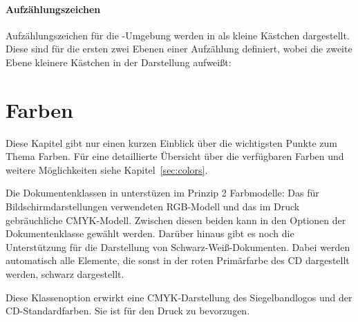 \paragraph{Aufzählungszeichen}

Aufzählungszeichen für die -Umgebung werden in \tubslatex
als kleine Kästchen dargestellt.
Diese sind für die ersten zwei Ebenen einer Aufzählung definiert, wobei
die zweite Ebene kleinere Kästchen in der Darstellung aufweißt:
\begin{center}
\end{center}



\section{Farben}

Diese Kapitel gibt nur einen kurzen Einblick über die wichtigsten Punkte
zum Thema Farben. Für eine detaillierte Übersicht über die verfügbaren Farben
und weitere Möglichkeiten siehe Kapitel~\ref{sec:colors}.%

Die Dokumentenklassen in \tubslatex unterstüzen im Prinzip 2 Farbmodelle:
Das für Bildschirmdarstellungen verwendeten RGB-Modell und das im
Druck gebräuchliche CMYK-Modell. Zwischen diesen beiden kann in den Optionen
der Dokumentenklasse gewählt werden. Darüber hinaus gibt es noch die Unterstützung
für die Darstellung von Schwarz-Weiß-Dokumenten. Dabei werden automatisch
alle Elemente, die sonst in der roten Primärfarbe des CD dargestellt werden,
schwarz dargestellt.

\begin{Declaration}
\end{Declaration}

Diese Klassenoption erwirkt eine CMYK-Darstellung des Siegelbandlogos und der
CD-Standardfarben. Sie ist für den Druck zu bevorzugen.

